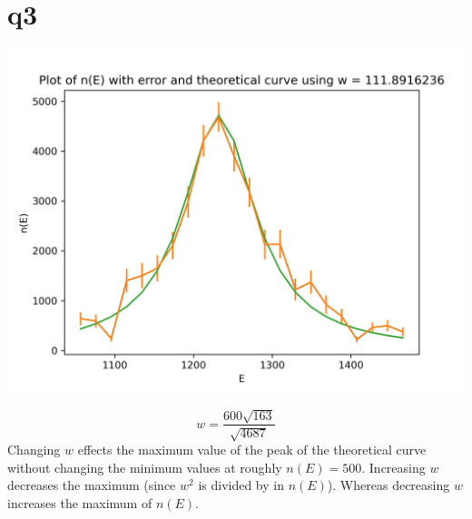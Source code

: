 \documentclass[a4paper,english]{article}
\begin{document}
    \section{q3}
    \begin{center}
    \includegraphics[scale=0.8]{./2_3th.png}
    \end{center}
        \begin{equation}
            w = \frac{600\sqrt{163}}{\sqrt{4687}}
        \end{equation}
        Changing $w$ effects the maximum value of the peak of the theoretical curve
        without changing the minimum values at roughly $n(E) = 500$. Increasing $w$
        decreases the maximum (since $w^2$ is divided by in $n(E)$). Whereas decreasing
        $w$ increases the maximum of $n(E)$.
\end{document}
